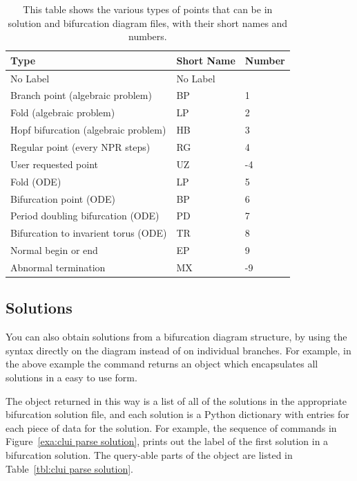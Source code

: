 \documentclass[12pt]{report}
\begin{document}
 \begin{table}[htbp]
 \begin{center}
 \begin{tabular}{| l | l | l |}
 \hline
 Type & Short Name & Number \\
 \hline
 No Label & No Label &  \\
 \hline
 Branch point (algebraic problem) & BP & 1 \\
 \hline
 Fold (algebraic problem) & LP & 2 \\
 \hline
 Hopf bifurcation (algebraic problem) & HB & 3 \\
 \hline
 Regular point (every NPR steps) & RG & 4 \\
 \hline
 User requested point & UZ & -4 \\
 \hline
 Fold (ODE) & LP & 5 \\
 \hline
 Bifurcation point (ODE) & BP & 6 \\
 \hline
 Period doubling bifurcation (ODE) & PD & 7 \\
 \hline
 Bifurcation to invarient torus (ODE) & TR & 8 \\
 \hline
 Normal begin or end & EP & 9 \\
 \hline
 Abnormal termination & MX & -9 \\
 \hline
 \end{tabular}
 \caption[Type translations.]
 {This table shows the various types of points
 that can be in solution and bifurcation diagram
 files, with their short names and numbers.}
 \label{tbl:clui type translation}
 \end{center}
 \end{table}

 \subsection{ Solutions}
 You can also obtain solutions from a bifurcation diagram structure,
 by using the \commandf{()} syntax directly on the diagram instead of
 on individual branches.
 For example, in the above example the command
 returns an object which encapsulates
 all solutions in a easy to use form.

 The object returned in this way
 is a list of all of the solutions in the appropriate
 bifurcation solution file, and each solution is a Python
 dictionary with entries for each  piece of
 data for the solution.  For example, the sequence of commands
 in Figure~\ref{exa:clui parse solution}, prints out the
 label of the first solution in a bifurcation solution.
 The query-able parts of the object are listed in
 Table~\ref{tbl:clui parse solution}.
\end{document}
